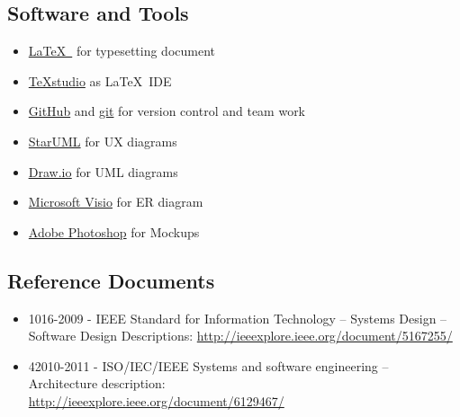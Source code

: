 \subsection{Software and Tools}
	\begin{itemize}
	\item
		\underline{\LaTeX\ } for typesetting document
	\item
		\underline{TeXstudio} as \LaTeX\ IDE
	\item
		\underline{GitHub} and \underline{git} for version control and team work
	\item
		\underline{StarUML} for UX diagrams
	\item
		\href{https://draw.io}{\underline{Draw.io}} for UML diagrams
	\item
		\underline{Microsoft Visio} for ER diagram
	\item
		\underline{Adobe Photoshop} for Mockups
	\end{itemize}
\subsection{Reference Documents}
	\begin{itemize}
		\item 1016-2009 - IEEE Standard for Information Technology -- Systems Design -- Software Design Descriptions: \href{http://ieeexplore.ieee.org/document/5167255/}{http://ieeexplore.ieee.org/document/5167255/}

		\item 42010-2011 - ISO/IEC/IEEE Systems and software engineering -- Architecture description:
		\\%
		 \href{http://ieeexplore.ieee.org/document/6129467/}{http://ieeexplore.ieee.org/document/6129467/}
	\end{itemize}